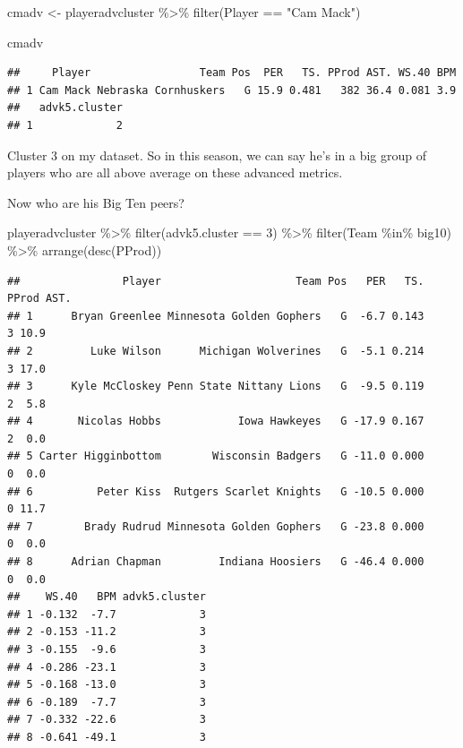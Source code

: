 \documentclass[
]{book}
\newenvironment{Shaded}{\begin{snugshade}}{\end{snugshade}}
\newcommand{\DecValTok}[1]{\textcolor[rgb]{0.00,0.00,0.81}{#1}}
\newcommand{\FunctionTok}[1]{\textcolor[rgb]{0.00,0.00,0.00}{#1}}
\newcommand{\NormalTok}[1]{#1}
\newcommand{\OtherTok}[1]{\textcolor[rgb]{0.56,0.35,0.01}{#1}}
\newcommand{\SpecialCharTok}[1]{\textcolor[rgb]{0.00,0.00,0.00}{#1}}
\newcommand{\StringTok}[1]{\textcolor[rgb]{0.31,0.60,0.02}{#1}}
\begin{document}
\begin{Shaded}
\begin{Highlighting}[]
\NormalTok{cmadv }\OtherTok{\textless{}{-}}\NormalTok{ playeradvcluster }\SpecialCharTok{\%\textgreater{}\%} \FunctionTok{filter}\NormalTok{(Player }\SpecialCharTok{==} \StringTok{"Cam Mack"}\NormalTok{)}

\NormalTok{cmadv}
\end{Highlighting}
\end{Shaded}

\begin{verbatim}
##     Player                 Team Pos  PER   TS. PProd AST. WS.40 BPM
## 1 Cam Mack Nebraska Cornhuskers   G 15.9 0.481   382 36.4 0.081 3.9
##   advk5.cluster
## 1             2
\end{verbatim}

Cluster 3 on my dataset. So in this season, we can say he's in a big group of players who are all above average on these advanced metrics.

Now who are his Big Ten peers?

\begin{Shaded}
\begin{Highlighting}[]
\NormalTok{playeradvcluster }\SpecialCharTok{\%\textgreater{}\%} 
  \FunctionTok{filter}\NormalTok{(advk5.cluster }\SpecialCharTok{==} \DecValTok{3}\NormalTok{) }\SpecialCharTok{\%\textgreater{}\%} 
  \FunctionTok{filter}\NormalTok{(Team }\SpecialCharTok{\%in\%}\NormalTok{ big10) }\SpecialCharTok{\%\textgreater{}\%} 
  \FunctionTok{arrange}\NormalTok{(}\FunctionTok{desc}\NormalTok{(PProd))}
\end{Highlighting}
\end{Shaded}

\begin{verbatim}
##                Player                     Team Pos   PER   TS. PProd AST.
## 1      Bryan Greenlee Minnesota Golden Gophers   G  -6.7 0.143     3 10.9
## 2         Luke Wilson      Michigan Wolverines   G  -5.1 0.214     3 17.0
## 3      Kyle McCloskey Penn State Nittany Lions   G  -9.5 0.119     2  5.8
## 4       Nicolas Hobbs            Iowa Hawkeyes   G -17.9 0.167     2  0.0
## 5 Carter Higginbottom        Wisconsin Badgers   G -11.0 0.000     0  0.0
## 6          Peter Kiss  Rutgers Scarlet Knights   G -10.5 0.000     0 11.7
## 7        Brady Rudrud Minnesota Golden Gophers   G -23.8 0.000     0  0.0
## 8      Adrian Chapman         Indiana Hoosiers   G -46.4 0.000     0  0.0
##    WS.40   BPM advk5.cluster
## 1 -0.132  -7.7             3
## 2 -0.153 -11.2             3
## 3 -0.155  -9.6             3
## 4 -0.286 -23.1             3
## 5 -0.168 -13.0             3
## 6 -0.189  -7.7             3
## 7 -0.332 -22.6             3
## 8 -0.641 -49.1             3
\end{verbatim}
\end{document}
